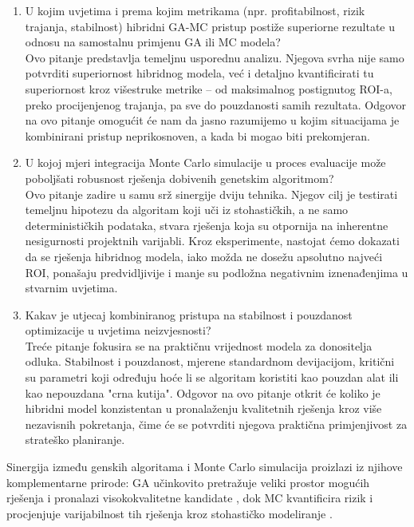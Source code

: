 \begin{enumerate}
\item U kojim uvjetima i prema kojim metrikama (npr. profitabilnost, rizik trajanja, stabilnost) hibridni GA-MC pristup postiže superiorne rezultate u odnosu na samostalnu primjenu GA ili MC modela? \\
Ovo pitanje predstavlja temeljnu usporednu analizu. Njegova svrha nije samo potvrditi superiornost hibridnog modela, već i detaljno kvantificirati tu superiornost kroz višestruke metrike – od maksimalnog postignutog ROI-a, preko procijenjenog trajanja, pa sve do pouzdanosti samih rezultata. Odgovor na ovo pitanje omogućit će nam da jasno razumijemo u kojim situacijama je kombinirani pristup neprikosnoven, a kada bi mogao biti prekomjeran.

\item U kojoj mjeri integracija Monte Carlo simulacije u proces evaluacije može poboljšati robusnost rješenja dobivenih genetskim algoritmom? \\
Ovo pitanje zadire u samu srž sinergije dviju tehnika. Njegov cilj je testirati temeljnu hipotezu da algoritam koji uči iz stohastičkih, a ne samo determinističkih podataka, stvara rješenja koja su otpornija na inherentne nesigurnosti projektnih varijabli. Kroz eksperimente, nastojat ćemo dokazati da se rješenja hibridnog modela, iako možda ne dosežu apsolutno najveći ROI, ponašaju predvidljivije i manje su podložna negativnim iznenađenjima u stvarnim uvjetima.

\item Kakav je utjecaj kombiniranog pristupa na stabilnost i pouzdanost optimizacije u uvjetima neizvjesnosti? \\
Treće pitanje fokusira se na praktičnu vrijednost modela za donositelja odluka. Stabilnost i pouzdanost, mjerene standardnom devijacijom, kritični su parametri koji određuju hoće li se algoritam koristiti kao pouzdan alat ili kao nepouzdana "crna kutija". Odgovor na ovo pitanje otkrit će koliko je hibridni model konzistentan u pronalaženju kvalitetnih rješenja kroz više nezavisnih pokretanja, čime će se potvrditi njegova praktična primjenjivost za strateško planiranje.
\end{enumerate}

Sinergija između genskih algoritama i Monte Carlo simulacija proizlazi iz njihove komplementarne prirode: GA učinkovito pretražuje veliki prostor mogućih rješenja i pronalazi visokokvalitetne kandidate \cite{Goldberg1989}, dok MC kvantificira rizik i procjenjuje varijabilnost tih rješenja kroz stohastičko modeliranje \cite{Rubinstein2016}.

